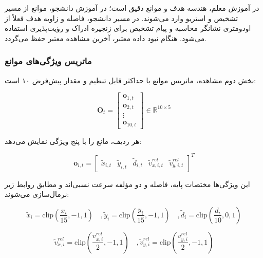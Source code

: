 در آموزش معلم، هندسه هدف و موانع دقیق است؛ در آموزش دانشجو، موانع از مسیر تشخیص و استریو وارد می‌شوند. در مسیر دانشجو، فاصله و زاویه هدف فعلاً از اودومتری نشانگر محاسبه و پیام تشخیص برای زنجیره ادراک و رؤیت‌پذیری استفاده می‌شود. هنگام نبود داده معتبر، آخرین مشاهده معتبر حفظ می‌گردد.

\subsubsection{ماتریس ویژگی‌های موانع}
\label{subsubsec:obstacle_features_final}

بخش دوم مشاهده، ماتریس موانع با حداکثر قابل تنظیم و مقدار پیش‌فرض ۱۰ است:

\begin{equation}
	\mathbf{O}_t =
	\begin{bmatrix}
		\mathbf{o}_{1,t} \\
		\mathbf{o}_{2,t} \\
		\vdots \\
		\mathbf{o}_{10,t}
	\end{bmatrix}
	\in \mathbb{R}^{10\times 5}
	\label{eq:obstacle_matrix_10x5_final}
\end{equation}

هر ردیف، مانع را با پنج ویژگی نمایش می‌دهد:

\begin{equation}
	\mathbf{o}_{i,t}=
	\begin{bmatrix}
		\tilde{x}_{i,t} &
		\tilde{y}_{i,t} &
		\tilde{d}_{i,t} &
		\tilde{v}^{rel}_{x,i,t} &
		\tilde{v}^{rel}_{y,i,t}
	\end{bmatrix}^{T}
	\label{eq:single_obstacle_feature_final}
\end{equation}

این ویژگی‌ها مختصات پایه، فاصله و دو مؤلفه سرعت نسبی‌اند و مطابق روابط زیر نرمال‌سازی می‌شوند:

\begin{equation}
	\tilde{x}_i=\mathrm{clip}\left(\frac{x_i}{15},-1,1\right)\quad,
	\tilde{y}_i=\mathrm{clip}\left(\frac{y_i}{15},-1,1\right)\quad,
	\tilde{d}_i=\mathrm{clip}\left(\frac{d_i}{10},0,1\right)
	\label{eq:obstacle_position_normalization_final}
\end{equation}

\begin{equation}
	\tilde{v}^{rel}_{x,i}=\mathrm{clip}\left(\frac{v^{rel}_{x,i}}{2},-1,1\right)\quad,
	\tilde{v}^{rel}_{y,i}=\mathrm{clip}\left(\frac{v^{rel}_{y,i}}{2},-1,1\right)
	\label{eq:obstacle_velocity_normalization_final}
\end{equation}


